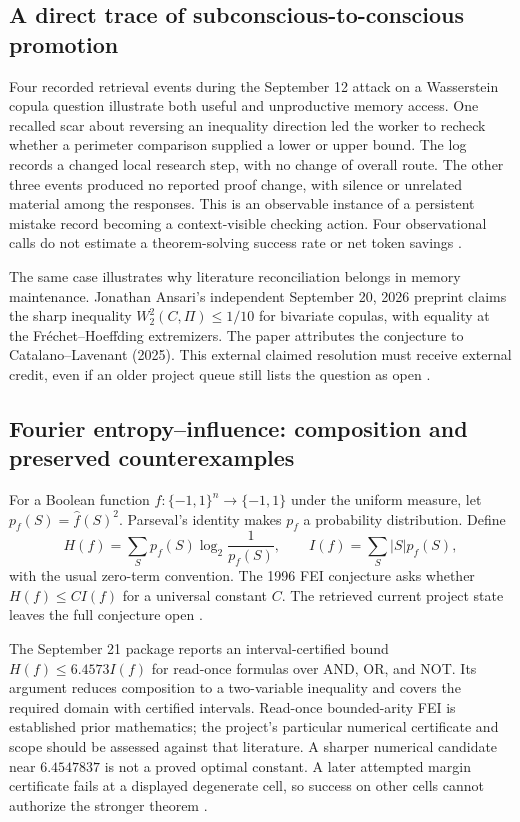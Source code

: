 

\subsection{A direct trace of subconscious-to-conscious promotion}

Four recorded retrieval events during the September 12 attack on a Wasserstein copula question illustrate both useful and unproductive memory access. One recalled scar about reversing an inequality direction led the worker to recheck whether a perimeter comparison supplied a lower or upper bound. The log records a changed local research step, with no change of overall route. The other three events produced no reported proof change, with silence or unrelated material among the responses. This is an observable instance of a persistent mistake record becoming a context-visible checking action. Four observational calls do not estimate a theorem-solving success rate or net token savings \citep{CaseBrainUsageG0013,CaseBrainUsageG0013Q2}.

The same case illustrates why literature reconciliation belongs in memory maintenance. Jonathan Ansari's independent September 20, 2026 preprint claims the sharp inequality $W_2^2(C,\Pi)\leq 1/10$ for bivariate copulas, with equality at the Fr\'echet--Hoeffding extremizers. The paper attributes the conjecture to Catalano--Lavenant (2025). This external claimed resolution must receive external credit, even if an older project queue still lists the question as open \citep{Ansari2026Copula}.

\subsection{Fourier entropy--influence: composition and preserved counterexamples}

For a Boolean function $f:\{-1,1\}^n\to\{-1,1\}$ under the uniform measure, let $p_f(S)=\widehat f(S)^2$. Parseval's identity makes $p_f$ a probability distribution. Define
\[
H(f)=\sum_S p_f(S)\log_2\frac1{p_f(S)},\qquad
I(f)=\sum_S |S|p_f(S),
\]
with the usual zero-term convention. The 1996 FEI conjecture asks whether $H(f)\leq C I(f)$ for a universal constant $C$. The retrieved current project state leaves the full conjecture open \citep{ODonnellTanFEI,CaseFEICurrent2026}.

The September 21 package reports an interval-certified bound $H(f)\leq6.4573I(f)$ for read-once formulas over AND, OR, and NOT. Its argument reduces composition to a two-variable inequality and covers the required domain with certified intervals. Read-once bounded-arity FEI is established prior mathematics; the project's particular numerical certificate and scope should be assessed against that literature. A sharper numerical candidate near $6.4547837$ is not a proved optimal constant. A later attempted margin certificate fails at a displayed degenerate cell, so success on other cells cannot authorize the stronger theorem \citep{CaseFEIReadOnce2026,ODonnellTanFEI}.

